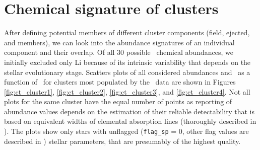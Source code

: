 \section{Chemical signature of clusters}
\label{sec:chem_cluster}
After defining potential members of different cluster components (field, ejected, and members), we can look into the abundance signatures of an individual component and their overlap. Of all 30 possible \Gh\ chemical abundances, we initially excluded only Li because of its intrinsic variability that depends on the stellar evolutionary stage. Scatters plots of all considered abundances and \Feh\ as a function of \Teff\ for clusters most populated by the \Gh\ data are shown in Figures \ref{fig:ct_cluster1}, \ref{fig:ct_cluster2}, \ref{fig:ct_cluster3}, and \ref{fig:ct_cluster4}. Not all plots for the same cluster have the equal number of points as reporting of abundance values depends on the estimation of their reliable detectability that is based on equivalent widths of elemental absorption lines (thoroughly described in \citet{buder2020}). The plots show only stars with unflagged (\texttt{flag\_sp} = 0, other flag values are described in \citet{buder2020}) stellar parameters, that are presumably of the highest quality.

